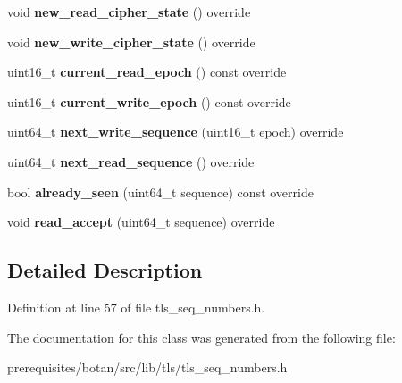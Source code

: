 \begin{DoxyCompactItemize}
\item 
\mbox{\label{class_botan_1_1_t_l_s_1_1_datagram___sequence___numbers_a6d894ac2824b106152b2a1dd21d362e2}} 
void {\bfseries new\+\_\+read\+\_\+cipher\+\_\+state} () override
\item 
\mbox{\label{class_botan_1_1_t_l_s_1_1_datagram___sequence___numbers_ad8da0bcd7ca649ecb55d2fbb7beec9a1}} 
void {\bfseries new\+\_\+write\+\_\+cipher\+\_\+state} () override
\item 
\mbox{\label{class_botan_1_1_t_l_s_1_1_datagram___sequence___numbers_a3e99076cbb523d862b84c09d235f682d}} 
uint16\+\_\+t {\bfseries current\+\_\+read\+\_\+epoch} () const override
\item 
\mbox{\label{class_botan_1_1_t_l_s_1_1_datagram___sequence___numbers_a755a6576198e9cb16518fa620165fc9c}} 
uint16\+\_\+t {\bfseries current\+\_\+write\+\_\+epoch} () const override
\item 
\mbox{\label{class_botan_1_1_t_l_s_1_1_datagram___sequence___numbers_a8464ea1edd8f0042275ef5a85712b202}} 
uint64\+\_\+t {\bfseries next\+\_\+write\+\_\+sequence} (uint16\+\_\+t epoch) override
\item 
\mbox{\label{class_botan_1_1_t_l_s_1_1_datagram___sequence___numbers_a36ee36c112c48aa75930002343e881d3}} 
uint64\+\_\+t {\bfseries next\+\_\+read\+\_\+sequence} () override
\item 
\mbox{\label{class_botan_1_1_t_l_s_1_1_datagram___sequence___numbers_aa1a007e3ccdeb690a7701c74c97664a6}} 
bool {\bfseries already\+\_\+seen} (uint64\+\_\+t sequence) const override
\item 
\mbox{\label{class_botan_1_1_t_l_s_1_1_datagram___sequence___numbers_a3de490cdefde8a3098948344fb3e8c88}} 
void {\bfseries read\+\_\+accept} (uint64\+\_\+t sequence) override
\end{DoxyCompactItemize}


\subsection{Detailed Description}


Definition at line 57 of file tls\+\_\+seq\+\_\+numbers.\+h.



The documentation for this class was generated from the following file\+:\begin{DoxyCompactItemize}
\item 
prerequisites/botan/src/lib/tls/tls\+\_\+seq\+\_\+numbers.\+h\end{DoxyCompactItemize}
